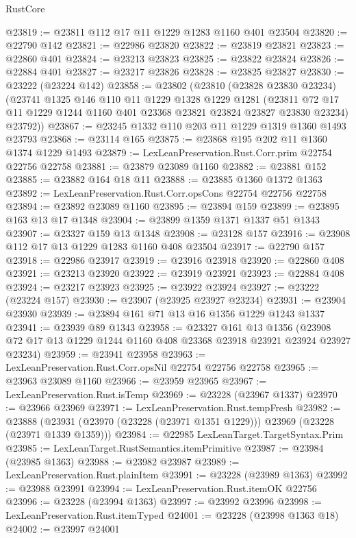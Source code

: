 \begin{lexlean}{RustCore}
\begin{coremodule}
@23819 := @23811 @112 @17 @11 @1229 @1283 @1160 @401 @23504
@23820 := @22790 @142
@23821 := @22986 @23820
@23822 := @23819 @23821
@23823 := @22860 @401
@23824 := @23213 @23823
@23825 := @23822 @23824
@23826 := @22884 @401
@23827 := @23217 @23826
@23828 := @23825 @23827
@23830 := @23222 (@23224 @142)
@23858 := @23802
    (@23810
      (@23828 @23830 @23234)
      (@23741
        @1325
        @146
        @110
        @11
        @1229
        @1328
        @1229
        @1281
        (@23811 @72 @17 @11 @1229 @1244 @1160 @401 @23368 @23821 @23824 @23827 @23830 @23234)
        @23792))
@23867 := @23245 @1332 @110 @203 @11 @1229 @1319 @1360 @1493 @23793
@23868 := @23114 @165
@23875 := @23868 @195 @202 @11 @1360 @1374 @1229 @1493
@23879 := LexLeanPreservation.Rust.Corr.prim @22754 @22756 @22758
@23881 := @23879 @23089 @1160
@23882 := @23881 @152
@23885 := @23882 @164 @18 @11
@23888 := @23885 @1360 @1372 @1363
@23892 := LexLeanPreservation.Rust.Corr.opsCons @22754 @22756 @22758
@23894 := @23892 @23089 @1160
@23895 := @23894 @159
@23899 := @23895 @163 @13 @17 @1348
@23904 := @23899 @1359 @1371 @1337 @51 @1343
@23907 := @23327 @159 @13 @1348
@23908 := @23128 @157
@23916 := @23908 @112 @17 @13 @1229 @1283 @1160 @408 @23504
@23917 := @22790 @157
@23918 := @22986 @23917
@23919 := @23916 @23918
@23920 := @22860 @408
@23921 := @23213 @23920
@23922 := @23919 @23921
@23923 := @22884 @408
@23924 := @23217 @23923
@23925 := @23922 @23924
@23927 := @23222 (@23224 @157)
@23930 := @23907 (@23925 @23927 @23234)
@23931 := @23904 @23930
@23939 := @23894 @161 @71 @13 @16 @1356 @1229 @1243 @1337
@23941 := @23939 @89 @1343
@23958 := @23327
    @161
    @13
    @1356
    (@23908 @72 @17 @13 @1229 @1244 @1160 @408 @23368 @23918 @23921 @23924 @23927 @23234)
@23959 := @23941 @23958
@23963 := LexLeanPreservation.Rust.Corr.opsNil @22754 @22756 @22758
@23965 := @23963 @23089 @1160
@23966 := @23959 @23965
@23967 := LexLeanPreservation.Rust.isTemp
@23969 := @23228 (@23967 @1337)
@23970 := @23966 @23969
@23971 := LexLeanPreservation.Rust.tempFresh
@23982 := @23888
    (@23931 (@23970 (@23228 (@23971 @1351 @1229))) @23969 (@23228 (@23971 @1339 @1359)))
@23984 := @22985 LexLeanTarget.TargetSyntax.Prim
@23985 := LexLeanTarget.RustSemantics.itemPrimitive
@23987 := @23984 (@23985 @1363)
@23988 := @23982 @23987
@23989 := LexLeanPreservation.Rust.plainItem
@23991 := @23228 (@23989 @1363)
@23992 := @23988 @23991
@23994 := LexLeanPreservation.Rust.itemOK @22756
@23996 := @23228 (@23994 @1363)
@23997 := @23992 @23996
@23998 := LexLeanPreservation.Rust.itemTyped
@24001 := @23228 (@23998 @1363 @18)
@24002 := @23997 @24001

\end{coremodule}
\end{lexlean}
